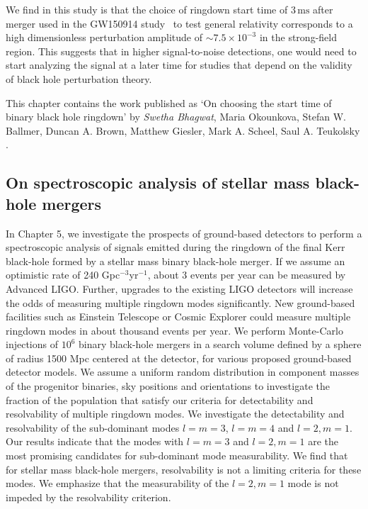 We find in this study is that the choice of ringdown start time of $3\,\mathrm{ms}$ after merger used in the
GW150914 study~\cite{TheLIGOScientific:2016src} to test general relativity corresponds to a high dimensionless
perturbation amplitude of $ \sim 7.5 \times 10^{-3}$ in the strong-field
region. This suggests that in higher signal-to-noise detections, one would need
to start analyzing the signal at a later time for studies that depend on the
validity of black hole perturbation theory.

This chapter contains the work published as `On choosing the start time of binary black hole ringdown' by 
\textit{Swetha Bhagwat}, Maria Okounkova, Stefan W. Ballmer, Duncan A. Brown, Matthew Giesler, Mark A. Scheel, Saul A. Teukolsky \cite{MeAndMasha}.



\subsection{On spectroscopic analysis of stellar mass black-hole mergers}
In Chapter 5, we investigate the prospects of ground-based detectors to perform a spectroscopic analysis of signals emitted during the ringdown of the final Kerr black-hole formed by a stellar mass binary black-hole merger. If we assume an optimistic rate of 240 Gpc$^{-3}$yr$^{-1}$, about 3 events per year can be measured by Advanced LIGO. Further, upgrades to the existing LIGO detectors will increase the odds of measuring multiple ringdown modes significantly. New ground-based facilities such as Einstein Telescope or Cosmic Explorer could measure multiple ringdown modes in about thousand events per year. We perform Monte-Carlo injections of $10^{6}$ binary black-hole mergers in a search volume defined by a sphere of radius 1500 Mpc centered at the detector, for various proposed ground-based detector models. We assume a uniform random distribution in component masses of the progenitor binaries, sky positions and orientations to investigate the fraction of the population that satisfy our criteria for detectability and resolvability of multiple ringdown modes. We investigate the detectability and resolvability of the sub-dominant modes $l=m=3$, $l=m=4$ and $l=2, m=1$. Our results indicate that the modes with $l=m=3$ and $l=2, m=1$ are the most promising candidates for sub-dominant mode measurability. We find that for stellar mass black-hole mergers, resolvability is not a limiting criteria for these modes. We emphasize that the measurability of the $l=2, m=1$ mode is not impeded by the resolvability criterion.

